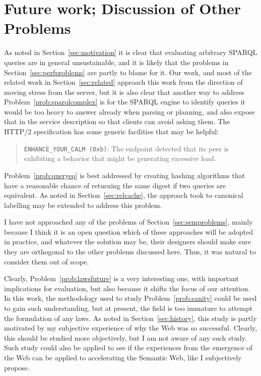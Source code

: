 

\section[Future Work]{Future work; Discussion of Other Problems}

As noted in Section~\ref{sec:motivation} it is clear that evaluating
arbitrary SPARQL queries are in general unsustainable, and it is
likely that the problems in Section~\ref{sec:perfproblems} are partly
to blame for it. Our work, and most of the related work in
Section~\ref{sec:related} approach this work from the direction of
moving stress from the server, but it is also clear that another way
to address Problem~\ref{prob:sparqlcomplex} is for the SPARQL engine
to identify queries it would be too heavy to answer already when
parsing or planning, and also expose that in the service description
so that clients can avoid asking them. The HTTP/2 specification
\cite{rfc7540} has some generic facilities that may be helpful: 

\begin{quote}
\texttt{ENHANCE\_YOUR\_CALM (0xb)}:  The endpoint detected that its peer is
      exhibiting a behavior that might be generating excessive load.
\end{quote}

Problem~\ref{prob:queryeq} is best addressed by creating hashing
algorithms that have a reasonable chance of returning the same digest
if two queries are equivalent. As noted in Section~\ref{sec:relcache},
the approach \cite{papailiou2015graph} took to canonical labelling may
be extended to address this problem.

I have not approached any of the problems of
Section~\ref{sec:semproblems}, mainly because I think it is an open
question which of these approaches will be adopted in practice, and
whatever the solution may be, their designers should make sure they
are orthogonal to the other problems discussed here. Thus, it was
natural to consider them out of scope. 

Clearly, Problem~\ref{prob:lawsfuture} is a very interesting one, with
important implications for evaluation, but also because it shifts the
focus of our attention. In this work, the methodology used to study
Problem~\ref{prob:sanity} could be used to gain such understanding,
but at present, the field is too immature to attempt the formulation
of any laws. As noted in Section~\ref{sec:history}, this study is
partly motivated by my subjective experience of why the Web was so
successful. Clearly, this should be studied more objectively, but I am
not aware of any such study. Such study could also be applied to see
if the experiences from the emergence of the Web can be applied to
accelerating the Semantic Web, like I subjectively propose.

